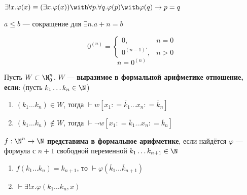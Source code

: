 \begin{definition}
    \(\exists !x.\varphi(x) \equiv (\exists x.\varphi(x)) \with \forall p.\forall q.\varphi(p) \with \varphi(q) \to p = q\)
\end{definition}

\begin{definition}
    \(a \leq b\) --- сокращение для \(\exists n.a + n = b\)
\end{definition}

\begin{definition}
    \[0^{(n)} = \begin{cases} 0, & n = 0 \\ 0^{(n - 1)'}, & n > 0 \end{cases}\]
    \[\overline n = 0^{(n)} \]
\end{definition}

\begin{definition}
    Пусть \(W \subset \N_0^n\). \(W\) --- \textbf{выразимое в формальной арифметике отношение, если}: (пусть \(k_1 \dots k_n \in \N\))
    \begin{enumerate}
        \item \((k_1\dots k_n)\in W\), тогда \(\vdash w[x_1: = \overline k_1 \dots x_n: = \overline k_n]\)
        \item \((k_1\dots k_n)\not\in W\), тогда \(\vdash \neg w[x_1: = \overline k_1 \dots x_n: = \overline k_n]\)
    \end{enumerate}
\end{definition}

\begin{definition}
    \(f : \N^n \to \N\) \textbf{представима в формальное арифметике}, если найдётся \(\varphi\) --- формула с \(n + 1\) свободной переменной \(k_1 \dots k_{n+1} \in \N\)
    \begin{enumerate}
        \item \(f(k_1\dots k_n) = k_{n+1}\), то \(\vdash \varphi(\overline k_1 \dots \overline k_{n+1})\)
        \item \(\vdash \exists ! x.\varphi(k_1 \dots k_n, x)\)
    \end{enumerate}
\end{definition}
